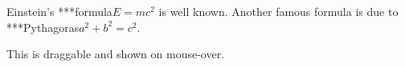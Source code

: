 \documentclass[a6paper,12pt]{scrbook}
\begin{document}
  Einstein's \tooltip****{formula}{$E=m c^2$} is well known.
  Another famous formula is due to \tooltip****{Pythagoras}{$a^2+b^2=c^2$}.

  This  is draggable and shown on mouse-over.
\end{document}
